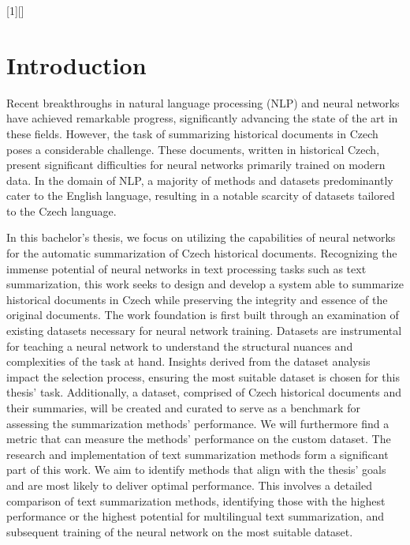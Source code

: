 \documentclass[english, ba, kiv, he, iso690numb, pdf, viewonly]{fasthesis}
\begin{document}
[1][]
{
    \lstset{style=FASThesisPythonStyle, language=Python, #1}
}
{
}

%
%
%
%
\setcounter{page}{1}
\chapter{Introduction}
Recent breakthroughs in natural language processing (NLP) and neural networks have achieved remarkable progress, significantly advancing the state of the art in these fields. However, the task of summarizing historical documents in Czech poses a considerable challenge. These documents, written in historical Czech, present significant difficulties for neural networks primarily trained on modern data. In the domain of NLP, a majority of methods and datasets predominantly cater to the English language, resulting in a notable scarcity of datasets tailored to the Czech language.

In this bachelor's thesis, we focus on utilizing the capabilities of neural networks for the automatic summarization of Czech historical documents. Recognizing the immense potential of neural networks in text processing tasks such as text summarization, this work seeks to design and develop a system able to summarize historical documents in Czech while preserving the integrity and essence of the original documents. The work foundation is first built through an examination of existing datasets necessary for neural network training. Datasets are instrumental for teaching a neural network to understand the structural nuances and complexities of the task at hand. Insights derived from the dataset analysis impact the selection process, ensuring the most suitable dataset is chosen for this thesis' task. Additionally, a dataset, comprised of Czech historical documents and their summaries, will be created and curated to serve as a benchmark for assessing the summarization methods' performance. We will furthermore find a metric that can measure the methods' performance on the custom dataset. The research and implementation of text summarization methods form a significant part of this work. We aim to identify methods that align with the thesis' goals and are most likely to deliver optimal performance. This involves a detailed comparison of text summarization methods, identifying those with the highest performance or the highest potential for multilingual text summarization, and subsequent training of the neural network on the most suitable dataset.
\end{document}
